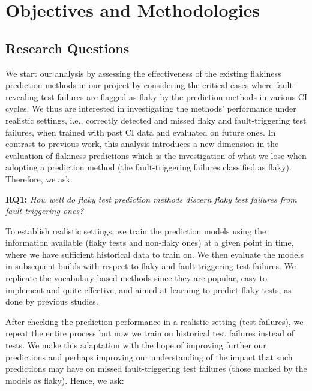 \section{Objectives and Methodologies}
\label{sec:chromium-objectives}

\subsection{Research Questions}

We start our analysis by assessing the effectiveness of the existing flakiness prediction methods in our project by considering the critical cases where fault-revealing test failures are flagged as flaky by the prediction methods in various CI cycles. We thus are interested in investigating the methods' performance under realistic settings, i.e., correctly detected and missed flaky and fault-triggering test failures, when trained with past CI data and evaluated on future ones. In contrast to previous work, this analysis introduces a new dimension in the evaluation of flakiness predictions which is the investigation of what we lose when adopting a prediction method (the fault-triggering failures classified as flaky). Therefore, we ask:

\begin{description}
    \item \textbf{\textsc{RQ1:}} \emph{How well do flaky test prediction methods discern flaky test failures from fault-triggering ones?}
\end{description}

To establish realistic settings, we train the prediction models using the information available (flaky tests and non-flaky ones) at a given point in time, where we have sufficient historical data to train on. We then evaluate the models in subsequent builds with respect to flaky and fault-triggering test failures. 
We replicate the vocabulary-based methods since they are popular, easy to implement and quite effective, and aimed at learning to predict flaky tests, as done by previous studies.

After checking the prediction performance in a realistic setting (test failures), we repeat the entire process but now we train on historical test failures instead of tests. We make this adaptation with the hope of improving further our predictions and perhaps improving our understanding of the impact that such predictions may have on missed fault-triggering test failures (those marked by the models as flaky). Hence, we ask: 

